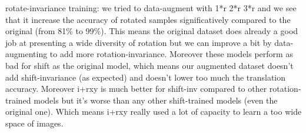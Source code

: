 \documentclass[a4paper,12pt]{article}
\begin{document}
rotate-invariance training: we tried to data-augment with 1*r 2*r 3*r and we see that it increase the accuracy of rotated samples significatively compared to the original (from 81\% to 99\%). This means the original dataset does already a good job at presenting a wide diversity of rotation but we can improve a bit by data-augmenting to add more rotation-invariance.
Moreover these models perform as bad for shift as the original model, which means our augmented dataset doesn't add shift-invariance (as expected) and doesn't lower too much the translation accuracy.
Moreover i+rxy is much better for shift-inv compared to other rotation-trained models but it's worse than any other shift-trained models (even the original one). Which means i+rxy really used a lot of capacity to learn a too wide space of images.
\end{document}
